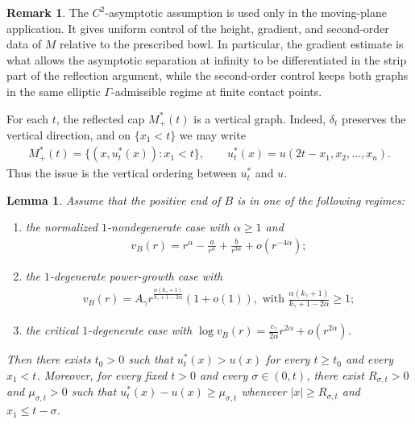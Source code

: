 \documentclass{amsart}
\theoremstyle{plain}
\newtheorem{lemma}[theorem]{Lemma}
\theoremstyle{mainintrothm}
\theoremstyle{definition}
\newtheorem{remark}[theorem]{Remark}
\begin{document}
	\begin{remark}
		\label{rem:C2-asymptotic-moving-plane}
		The $C^2$-asymptotic assumption is used only in the moving-plane
		application.  It gives uniform control of the height, gradient, and
		second-order data of $M$ relative to the prescribed bowl.  In particular,
		the gradient estimate is what allows the asymptotic separation at infinity
		to be differentiated in the strip part of the reflection argument, while
		the second-order control keeps both graphs in the same elliptic
		$\Gamma$-admissible regime at finite contact points.
	\end{remark}
	
	For each $t$, the reflected cap $M_+^*(t)$ is a vertical graph.  Indeed,
	$\delta_t$ preserves the vertical direction, and on $\{x_1<t\}$ we may write
	\begin{align*}
		M_+^*(t)=\{(x,u_t^*(x)):x_1<t\},
		\qquad
		u_t^*(x)=u(2t-x_1,x_2,\ldots,x_n).
	\end{align*}
	Thus the issue is the vertical ordering between $u_t^*$ and $u$.
	
	\begin{lemma}
		\label{lem:start-moving-plane-at-infinity}
		Assume that the positive end of $B$ is in one of the following regimes:
		\begin{enumerate}[label=\textup{(\roman*)}]
			\item the normalized $1$-nondegenerate case with $\alpha\ge1$ and
			\begin{align*}
				v_B(r)=r^\alpha-\frac{a}{r^\alpha}+\frac{b}{r^{3\alpha}}+o(r^{-4\alpha});
			\end{align*}
			
			\item the $1$-degenerate power-growth case with
			\begin{align*}
				v_B(r)
				=
				A_\gamma
				r^{
					\frac{\alpha(k_\gamma+1)}
					{k_\gamma+1-2\alpha}
				}
				(1+o(1)),
				\mbox{ with }
				\frac{\alpha(k_\gamma+1)}
				{k_\gamma+1-2\alpha}\ge1;
			\end{align*}
			
			\item the critical $1$-degenerate case with
			$\log v_B(r)=\frac{c_\gamma}{2\alpha}r^{2\alpha}+o(r^{2\alpha})$.
		\end{enumerate}
		Then there exists $t_0>0$ such that $u_t^*(x)>u(x)$ for every
		$t\ge t_0$ and every $x_1<t$.  Moreover, for every fixed $t>0$ and every
		$\sigma\in(0,t)$, there exist $R_{\sigma,t}>0$ and $\mu_{\sigma,t}>0$ such
		that $u_t^*(x)-u(x)\ge\mu_{\sigma,t}$ whenever $|x|\ge R_{\sigma,t}$ and $x_1\le t-\sigma$.
	\end{lemma}
	
\end{document}
